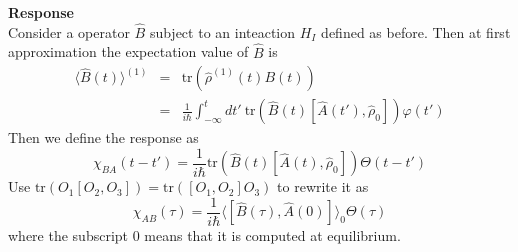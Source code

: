 \documentclass[12pt,a4paper]{article}
\newcommand{\integral}[3]{\int_{#1}^{#2} d #3 \ } %
\newcommand{\tr}{\text{tr}}
\begin{document}
\textbf{Response}\\
Consider a operator $\hat{B}$ subject to an inteaction $H_I$ defined as before. Then at  first approximation the expectation value of $\hat{B}$ is 
\begin{eqnarray}
	  \langle \hat{B}(t) \rangle^{(1)} & = & \text{tr}\left(\hat{\rho}^{(1)}(t                                                                                                                                                                                    )B(t)\right) \\
	  & = & \frac{1}{i\hbar}\integral{-\infty}{t}{t'}\text{tr}\left(\hat{B}(t)[\hat{A}(t'),\hat{\rho}_0]\right)\varphi(t')
\end{eqnarray}
Then we define the response as
\begin{equation}
	\chi_{BA}(t-t') = \frac{1}{i\hbar} \text{tr}\left(\hat{B}(t)[\hat{A}(t),\hat{\rho}_0]\right) \Theta(t-t')
\end{equation}
Use $\tr \left(O_1 [O_2,O_3] \right) = \tr \left([O_1,O_2]O_3 \right)$ to rewrite it as
\begin{equation}
\chi_{AB}(\tau) = \frac{1}{i\hbar}\langle [\hat{B}(\tau),\hat{A}(0)]\rangle_0 \Theta(\tau)
\end{equation}
where the subscript 0 means that it is computed at equilibrium.
\end{document}
